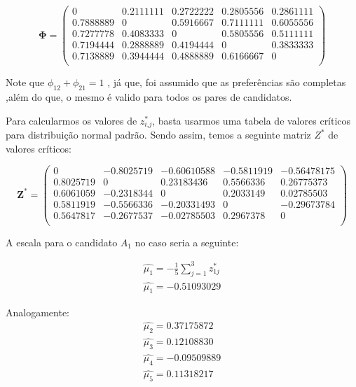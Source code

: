 \documentclass[
	article,			%
	12pt,				%
	oneside,			%
	a4paper,			%
	english,			%
	brazil,				%
	]{abntex2}
\begin{document}
\begin{displaymath}
\mathbf{\Phi}=\left(\begin{array}{cccccc}
0 & 0.2111111 & 0.2722222 & 0.2805556 & 0.2861111\\
0.7888889 & 0 & 0.5916667 & 0.7111111 & 0.6055556\\
0.7277778 & 0.4083333 & 0 & 0.5805556 & 0.5111111\\
0.7194444 & 0.2888889 & 0.4194444 & 0 & 0.3833333\\
0.7138889 & 0.3944444 & 0.4888889 & 0.6166667 & 0\\
\end{array}\right)
\end{displaymath}

Note que $\phi_\textit{12} + \phi_\textit{21} = 1$ , já que, foi assumido que as preferências são completas ,além do que, o mesmo é valido para todos os pares de candidatos.
 
Para calcularmos os valores de $z^*_\textit{i,j}$, basta usarmos uma tabela de valores críticos para distribuição normal padrão. Sendo assim, temos a seguinte matriz $Z^*$ de valores críticos:

\begin{displaymath}
\mathbf{Z^*}=\left(\begin{array}{cccccc}
0 & -0.8025719 & -0.60610588
 & -0.5811919 & -0.56478175\\
0.8025719 & 0 & 0.23183436 & 0.5566336 & 0.26775373\\
0.6061059 & -0.2318344 & 0 & 0.2033149 & 0.02785503\\
0.5811919 & -0.5566336 & -0.20331493 & 0 & -0.29673784\\
0.5647817 & -0.2677537 & -0.02785503 & 0.2967378 & 0 \\
\end{array}\right)
\end{displaymath}

A escala para o candidato $A_\textit{1}$ no caso seria a seguinte:

\begin{align*}
\hat {\mu_\textit{1}} = - \frac{1}{5} \sum_{j=1}^{3} z^*_\textit{1j} \\
\hat {\mu_\textit{1}} = -0.51093029
\end{align*}

Analogamente:
\begin{align*}
\hat {\mu_\textit{2}} = 0.37175872\\
\hat {\mu_\textit{3}} = 0.12108830\\
\hat {\mu_\textit{4}} = -0.09509889\\
\hat {\mu_\textit{5}} = 0.11318217
\end{align*}
\end{document}
